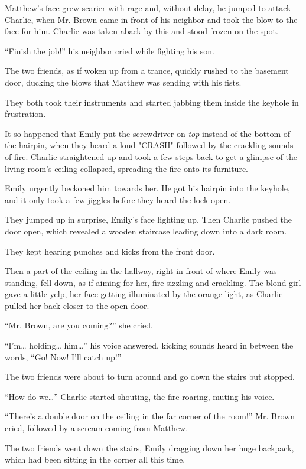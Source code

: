 Matthew's face grew scarier with rage and, without delay, he jumped to attack Charlie, when Mr. Brown came in front of his neighbor and took the blow to the face for him. Charlie was taken aback by this and stood frozen on the spot.

“Finish the job!” his neighbor cried while fighting his son.

The two friends, as if woken up from a trance, quickly rushed to the basement door, ducking the blows that Matthew was sending with his fists.

They both took their instruments and started jabbing them inside the keyhole in frustration.

It so happened that Emily put the screwdriver on \textit{top} instead of the bottom of the hairpin, when they heard a loud "CRASH" followed by the crackling sounds of fire. Charlie straightened up and took a few steps back to get a glimpse of the living room's ceiling collapsed, spreading the fire onto its furniture.

Emily urgently beckoned him towards her. He got his hairpin into the keyhole, and it only took a few jiggles before they heard the lock open.

They jumped up in surprise, Emily's face lighting up. Then Charlie pushed the door open, which revealed a wooden staircase leading down into a dark room.

They kept hearing punches and kicks from the front door. 

Then a part of the ceiling in the hallway, right in front of where Emily was standing, fell down, as if aiming for her, fire sizzling and crackling. The blond girl gave a little yelp, her face getting illuminated by the orange light, as Charlie pulled her back closer to the open door.

“Mr. Brown, are you coming?” she cried.

“I'm… holding… him…” his voice answered, kicking sounds heard in between the words, “Go! Now! I'll catch up!”

The two friends were about to turn around and go down the stairs but stopped.

“How do we…” Charlie started shouting, the fire roaring, muting his voice.

“There's a double door on the ceiling in the far corner of the room!” Mr. Brown cried, followed by a scream coming from Matthew.

The two friends went down the stairs, Emily dragging down her huge backpack, which had been sitting in the corner all this time.

